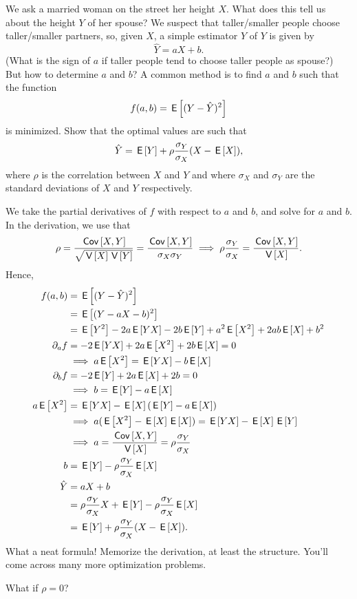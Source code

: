\begin{exercise}
We ask a married woman on the street her height $X$.
What does this tell us about the height $Y$ of her spouse?
We suspect that taller/smaller people choose taller/smaller partners, so, given $X$, a simple estimator $\hat Y$ of $Y$ is given by
\begin{equation*}
  \hat Y = a X + b.
\end{equation*}
(What is the sign of $a$ if taller people tend to choose taller people as spouse?)
But how to determine $a$ and $b$? A common method is to find $a$ and $b$ such that the function
\begin{equation*}
  f(a,b) = \,\mathsf{E}\left[(Y-\hat Y)^2\right]
\end{equation*}
is minimized. Show that the optimal values are such that
\begin{align*}
  \hat Y = \,\mathsf{E}\left[Y\right] + \rho \frac{\sigma_Y}{\sigma_X} (X - \,\mathsf{E}\left[X\right]),
\end{align*}
where $\rho$ is the correlation between $X$ and $Y$ and where $\sigma_X$ and $\sigma_Y$ are the standard deviations of $X$ and $Y$ respectively.

\begin{solution}
We take the partial derivatives of $f$ with respect to $a$ and $b$, and solve for $a$ and $b$. In the derivation, we use that
\begin{align}
  \label{eq:336}
\rho = \frac{\,\mathsf{Cov}\left[X,Y\right]}{\sqrt{\,\mathsf{V}\left[X\right] \,\mathsf{V}\left[Y\right]}} = \frac{\,\mathsf{Cov}\left[X,Y\right]}{\sigma_X \sigma_Y} \implies  \rho \frac{\sigma_{Y}}{\sigma_{X}} = \frac{\,\mathsf{Cov}\left[X,Y\right]}{\,\mathsf{V}\left[X\right]}.
\end{align}
Hence,
  \begin{align*}
f(a,b) &= \,\mathsf{E}\left[(Y-\hat Y)^2\right] \\
 &= \,\mathsf{E}\left[(Y-a X - b)^2\right] \\
 &= \,\mathsf{E}\left[Y^{2}\right] - 2a\,\mathsf{E}\left[YX\right] - 2b\,\mathsf{E}\left[Y\right] + a^{2}\,\mathsf{E}\left[X^2\right] + 2 ab \,\mathsf{E}\left[X\right] + b^{2}\\
\partial_{a} f &=-2 \,\mathsf{E}\left[YX\right] + 2a \,\mathsf{E}\left[X^2\right] + 2 b \,\mathsf{E}\left[X\right] = 0 \\
&\implies a \,\mathsf{E}\left[X^2\right] =  \,\mathsf{E}\left[YX\right]  -  b \,\mathsf{E}\left[X\right] \\
\partial_{b} f &=-2 \,\mathsf{E}\left[Y\right]  + 2 a \,\mathsf{E}\left[X\right]  + 2 b= 0 \\
& \implies  b = \,\mathsf{E}\left[Y\right] - a \,\mathsf{E}\left[X\right]\\
a \,\mathsf{E}\left[X^2\right] &=  \,\mathsf{E}\left[YX\right]  -  \,\mathsf{E}\left[X\right] (\,\mathsf{E}\left[Y\right] - a \,\mathsf{E}\left[X\right]) \\
&\implies  a (\,\mathsf{E}\left[X^{2}\right] - \,\mathsf{E}\left[X\right] \,\mathsf{E}\left[X\right])  = \,\mathsf{E}\left[YX\right] - \,\mathsf{E}\left[X\right] \,\mathsf{E}\left[Y\right]  \\
&\implies a = \frac{\,\mathsf{Cov}\left[X,Y\right]}{\,\mathsf{V}\left[X\right]} = \rho \frac{\sigma_Y}{\sigma_X}\\
b &= \,\mathsf{E}\left[Y\right] - \rho \frac{\sigma_Y}{\sigma_X}\,\mathsf{E}\left[X\right]\\
\hat Y &= a X + b \\
&= \rho \frac{\sigma_Y}{\sigma_X} X + \,\mathsf{E}\left[Y\right] - \rho\frac{\sigma_Y}{\sigma_X} \,\mathsf{E}\left[X\right] \\
&=  \,\mathsf{E}\left[Y\right] + \rho \frac{\sigma_Y}{\sigma_X} (X-\,\mathsf{E}\left[X\right]).
  \end{align*}
What a neat formula! Memorize the derivation, at least the structure. You'll come across many more optimization problems.

What if $\rho=0$?
\end{solution}
\end{exercise}


